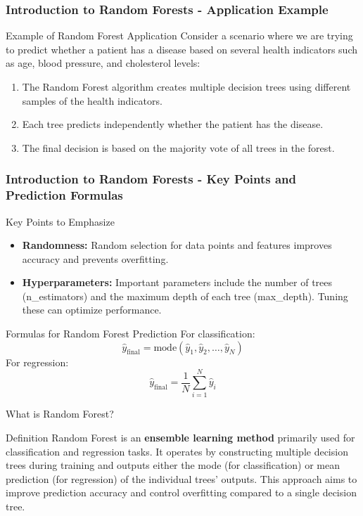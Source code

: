 \documentclass[aspectratio=169]{beamer}
\begin{document}
\begin{frame}[fragile]
    \frametitle{Introduction to Random Forests - Application Example}
    \begin{block}{Example of Random Forest Application}
        Consider a scenario where we are trying to predict whether a patient has a disease based on several health indicators such as age, blood pressure, and cholesterol levels:
        \begin{enumerate}
            \item The Random Forest algorithm creates multiple decision trees using different samples of the health indicators.
            \item Each tree predicts independently whether the patient has the disease.
            \item The final decision is based on the majority vote of all trees in the forest.
        \end{enumerate}
    \end{block}
\end{frame}

\begin{frame}[fragile]
    \frametitle{Introduction to Random Forests - Key Points and Prediction Formulas}
    \begin{block}{Key Points to Emphasize}
        \begin{itemize}
            \item \textbf{Randomness:} Random selection for data points and features improves accuracy and prevents overfitting.
            \item \textbf{Hyperparameters:} Important parameters include the number of trees (n\_estimators) and the maximum depth of each tree (max\_depth). Tuning these can optimize performance.
        \end{itemize}
    \end{block}
    
    \begin{block}{Formulas for Random Forest Prediction}
        For classification:
        \[
        \hat{y}_{\text{final}} = \text{mode}(\hat{y}_1, \hat{y}_2, \dots, \hat{y}_N)
        \]
        For regression:
        \[
        \hat{y}_{\text{final}} = \frac{1}{N} \sum_{i=1}^{N} \hat{y}_i
        \]
    \end{block}
\end{frame}

\begin{frame}[fragile]{What is Random Forest?}
    \begin{block}{Definition}
        Random Forest is an \textbf{ensemble learning method} primarily used for classification and regression tasks. 
        It operates by constructing multiple decision trees during training and outputs either the mode (for classification) or mean prediction (for regression) of the individual trees' outputs. 
        This approach aims to improve prediction accuracy and control overfitting compared to a single decision tree.
    \end{block}
\end{frame}
\end{document}
